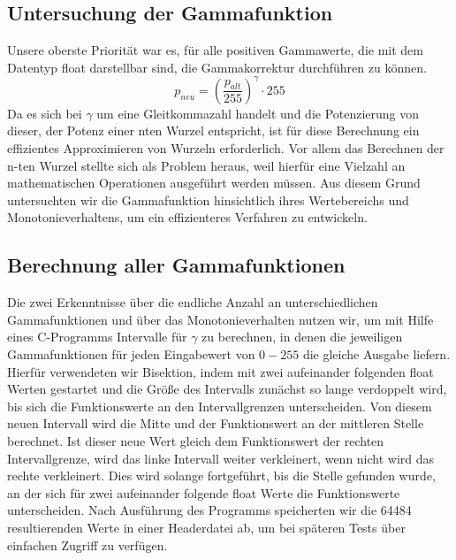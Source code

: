\documentclass[course=erap]{aspdoc}
\begin{document}
	
	\subsection{Untersuchung der Gammafunktion}
	Unsere oberste Priorität war es, für alle positiven Gammawerte, die mit dem Datentyp float darstellbar sind, die Gammakorrektur durchführen zu können.
	\begin{equation}
	p_{neu} = \left(\frac{p_{alt}}{255}\right)^{\gamma} \cdot 255
	\end{equation}   
	Da es sich bei $\gamma$ um eine Gleitkommazahl handelt und die Potenzierung von dieser, der Potenz einer nten Wurzel entspricht, ist für diese Berechnung ein effizientes Approximieren von Wurzeln erforderlich. Vor allem das Berechnen der n-ten Wurzel stellte sich als Problem heraus, weil hierfür eine Vielzahl an mathematischen Operationen ausgeführt werden müssen. Aus diesem Grund untersuchten wir die Gammafunktion hinsichtlich ihres Wertebereichs und Monotonieverhaltens, um ein effizienteres Verfahren zu entwickeln.
	\newline
	
	\subsection{Berechnung aller Gammafunktionen}
	Die zwei Erkenntnisse über die endliche Anzahl an unterschiedlichen Gammafunktionen und über das Monotonieverhalten nutzen wir, um mit Hilfe eines C-Programms Intervalle für $\gamma$ zu berechnen, in denen die jeweiligen Gammafunktionen für jeden Eingabewert von $0-255$ die gleiche Ausgabe liefern. Hierfür verwendeten wir Bisektion, indem mit zwei aufeinander folgenden float Werten gestartet und die Größe des Intervalls zunächst so lange verdoppelt wird, bis sich die Funktionswerte an den Intervallgrenzen unterscheiden. Von diesem neuen Intervall wird die Mitte und der Funktionswert an der mittleren Stelle berechnet. Ist dieser neue Wert gleich dem Funktionswert der rechten Intervallgrenze, wird das linke Intervall weiter verkleinert, wenn nicht wird das rechte verkleinert. Dies wird solange fortgeführt, bis die Stelle gefunden wurde, an der sich für zwei aufeinander folgende float Werte die Funktionswerte unterscheiden. Nach Ausführung des Programms speicherten wir die 64484 resultierenden Werte in einer Headerdatei ab, um bei späteren Tests über einfachen Zugriff zu verfügen.
	
\end{document}
